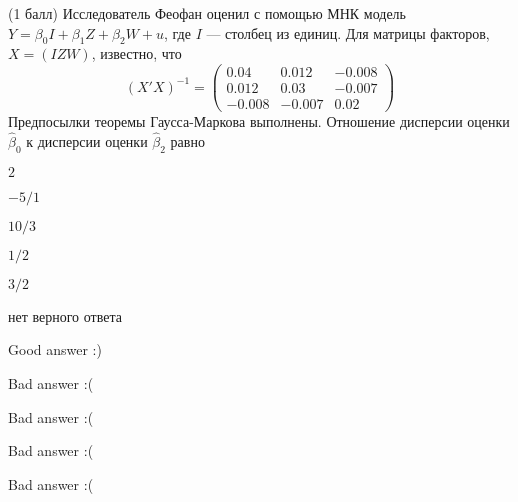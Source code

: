 
\begin{question}
(1 балл) Исследователь Феофан оценил с помощью МНК модель
\(Y = \beta_0 I + \beta_1 Z + \beta_2 W + u\), где \(I\) --- столбец из
единиц. Для матрицы факторов, \(X = (I Z W)\), известно, что \[
(X'X)^{-1} = \begin{pmatrix}
0.04 & 0.012 & -0.008 \\
0.012 & 0.03 & -0.007 \\
-0.008 & -0.007 & 0.02
\end{pmatrix}
\] Предпосылки теоремы Гаусса-Маркова выполнены. Отношение дисперсии
оценки \(\hat \beta_0\) к дисперсии оценки \(\hat \beta_2\) равно
\begin{answerlist}
  \item \(2\)
  \item \(-5/1\)
  \item \(10/3\)
  \item \(1/2\)
  \item \(3/2\)
  \item нет верного ответа
\end{answerlist}
\end{question}

\begin{solution}
\begin{answerlist}
  \item Good answer :)
  \item Bad answer :(
  \item Bad answer :(
  \item Bad answer :(
  \item Bad answer :(
\end{answerlist}
\end{solution}
